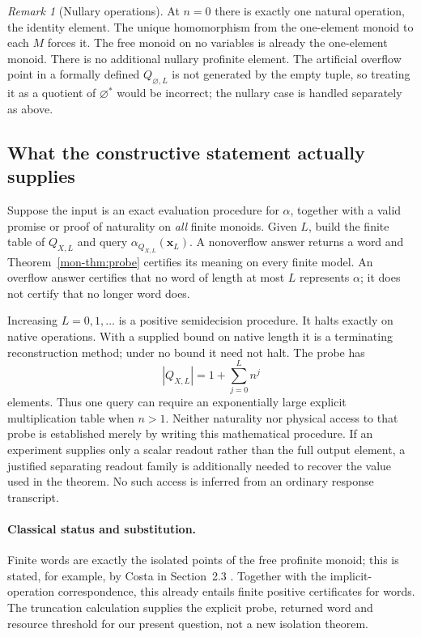 \documentclass[11pt]{article}
\theoremstyle{definition}
\theoremstyle{remark}
\newtheorem{remark}[theorem]{Remark}
\begin{document}
\begin{remark}[Nullary operations]
At $n=0$ there is exactly one natural operation, the identity element.
The unique homomorphism from the one-element monoid to each $M$ forces it.
The free monoid on no variables is already the one-element monoid.
There is no additional nullary profinite element. The artificial overflow
point in a formally defined $Q_{\varnothing,L}$ is not generated by the
empty tuple, so treating it as a quotient of $\varnothing^*$ would be
incorrect; the nullary case is handled separately as above.
\end{remark}

\subsection{What the constructive statement actually supplies}
Suppose the input is an exact evaluation procedure for $\alpha$, together
with a valid promise or proof of naturality on \emph{all} finite monoids.
Given $L$, build the finite table of $Q_{X,L}$ and query
$\alpha_{Q_{X,L}}(\mathbf x_L)$. A nonoverflow answer returns a word and
Theorem~\ref{mon-thm:probe} certifies its meaning on every finite model. An
overflow answer certifies that no word of length at most $L$ represents
$\alpha$; it does not certify that no longer word does.

Increasing $L=0,1,\ldots$ is a positive semidecision procedure. It halts
exactly on native operations. With a supplied bound on native length it is
a terminating reconstruction method; under no bound it need not halt.
The probe has
\[
 |Q_{X,L}|=1+\sum_{j=0}^{L}n^j
\]
elements. Thus one query can require an exponentially large explicit
multiplication table when $n>1$. Neither naturality nor physical access to
that probe is established merely by writing this mathematical procedure.
If an experiment supplies only a scalar readout rather than the full
output element, a justified separating readout family is additionally
needed to recover the value used in the theorem. No such access is inferred
from an ordinary response transcript.


\paragraph{Classical status and substitution.}
Finite words are exactly the isolated points of the free profinite monoid;
this is stated, for example, by Costa in Section~2.3 \cite{Costa}.
Together with the implicit-operation correspondence, this already entails
finite positive certificates for words. The truncation calculation supplies
the explicit probe, returned word and resource threshold for our present
question, not a new isolation theorem.
\end{document}
